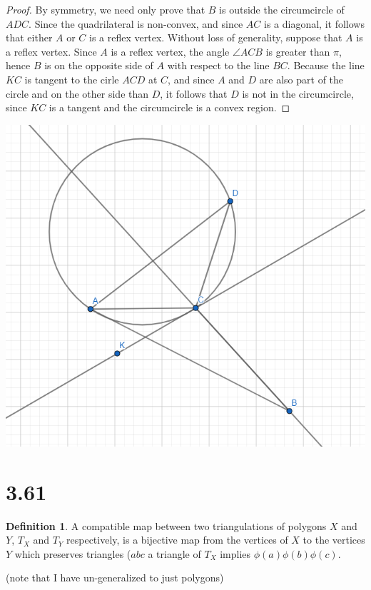 \documentclass[12pt]{article}
\theoremstyle{definition}
\newtheorem*{definition}{Definition}
\begin{document}
\begin{proof}
By symmetry, we need only prove that $B$ is outside the circumcircle of $ADC$. Since the quadrilateral is non-convex, and since $AC$ is a diagonal, it follows that either $A$ or $C$ is a reflex vertex. Without loss of generality, suppose that $A$ is a reflex vertex. Since $A$ is a reflex vertex, the angle $\angle ACB$ is greater than $\pi$, hence $B$ is on the opposite side of $A$ with respect to the line $BC$. Because the line $KC$ is tangent to the cirle $ACD$ at $C$, and since $A$ and $D$ are also part of the circle and on the other side than $D$, it follows that $D$ is not in the circumcircle, since $KC$ is a tangent and the circumcircle is a convex region.
\end{proof}
\includegraphics[scale=1]{non-convex.png} 

\section{3.61}


\begin{definition}
A compatible map between two triangulations of polygons $X$ and $Y$, $T_X$ and $T_Y$ respectively, is a bijective map from the vertices of $X$ to the vertices $Y$ which preserves triangles ($abc$ a triangle of $T_X$ implies $\phi(a)\phi(b)\phi(c)$.
\end{definition}

(note that I have un-generalized to just polygons)
\end{document}
